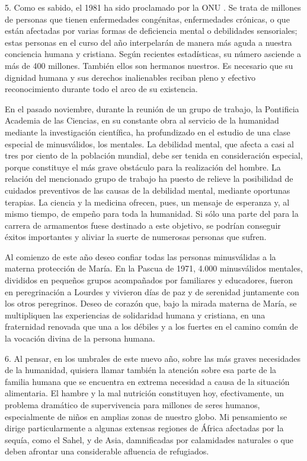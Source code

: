 \begin{body}
	5. Como es sabido, el 1981 ha sido proclamado por la ONU . Se trata de millones de personas que tienen enfermedades congénitas, enfermedades crónicas, o que están afectadas por varias formas de deficiencia mental o debilidades sensoriales; estas personas en el curso del año interpelarán de manera más aguda a nuestra conciencia humana y cristiana. Según recientes estadísticas, su número asciende a más de 400 millones. También ellos son hermanos nuestros. Es necesario que su dignidad humana y sus derechos inalienables reciban pleno y efectivo reconocimiento durante todo el arco de su existencia.
	
	En el pasado noviembre, durante la reunión de un grupo de trabajo, la Pontificia Academia de las Ciencias, en su constante obra al servicio de la humanidad mediante la investigación científica, ha profundizado en el estudio de una clase especial de minusválidos, los mentales. La debilidad mental, que afecta a casi al tres por ciento de la población mundial, debe ser tenida en consideración especial, porque constituye el más grave obstáculo para la realización del hombre. La relación del mencionado grupo de trabajo ha puesto de relieve la posibilidad de cuidados preventivos de las causas de la debilidad mental, mediante oportunas terapias. La ciencia y la medicina ofrecen, pues, un mensaje de esperanza y, al mismo tiempo, de empeño para toda la humanidad. Si sólo una parte del  para la carrera de armamentos fuese destinado a este objetivo, se podrían conseguir éxitos importantes y aliviar la suerte de numerosas personas que sufren.
	
	Al comienzo de este año deseo confiar todas las personas minusválidas a la materna protección de María. En la Pascua de 1971, 4.000 minusválidos mentales, divididos en pequeños grupos acompañados por familiares y educadores, fueron en peregrinación a Lourdes y vivieron días de paz y de serenidad juntamente con los otros peregrinos. Deseo de corazón que, bajo la mirada materna de María, se multipliquen las experiencias de solidaridad humana y cristiana, en una fraternidad renovada que una a los débiles y a los fuertes en el camino común de la vocación divina de la persona humana.
	
	6. Al pensar, en los umbrales de este nuevo año, sobre las más graves necesidades de la humanidad, quisiera llamar también la atención sobre esa parte de la familia humana que se encuentra en extrema necesidad a causa de la situación alimentaria. El hambre y la mal nutrición constituyen hoy, efectivamente, un problema dramático de supervivencia para millones de seres humanos, especialmente de niños en amplias zonas de nuestro globo. Mi pensamiento se dirige particularmente a algunas extensas regiones de África afectadas por la sequía, como el Sahel, y de Asia, damnificadas por calamidades naturales o que deben afrontar una considerable afluencia de refugiados.
	

\end{body}
